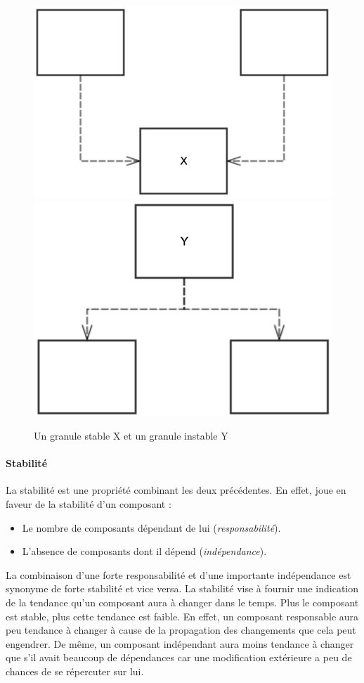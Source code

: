 \documentclass{scrartcl}
\begin{document}
    \begin{figure}[ht]
        \includegraphics[width=\textwidth/2]{img/StableGranule.png}
        \includegraphics[width=\textwidth/2]{img/InstableGranule.png}
        \caption{Un granule stable X et un granule instable Y}
    \end{figure}
    
    
    \paragraph{Stabilité}La stabilité est une propriété combinant les deux précédentes. En effet, joue en faveur de la stabilité d'un composant :
    \begin{itemize}
    	\item Le nombre de composants dépendant de lui (\emph{responsabilité}).
    	\item L'absence de composants dont il dépend (\emph{indépendance}).
    \end{itemize}
    La combinaison d'une forte responsabilité et d'une importante indépendance est synonyme de forte stabilité et vice versa. La stabilité vise à fournir une indication de la tendance qu'un composant aura à changer dans le temps. Plus le composant est stable, plus cette tendance est faible. En effet, un composant responsable aura peu tendance à changer à cause de la propagation des changements que cela peut engendrer. De même, un composant indépendant aura moins tendance à changer que s'il avait beaucoup de dépendances car une modification extérieure a peu de chances de se répercuter sur lui.
    
\end{document}
